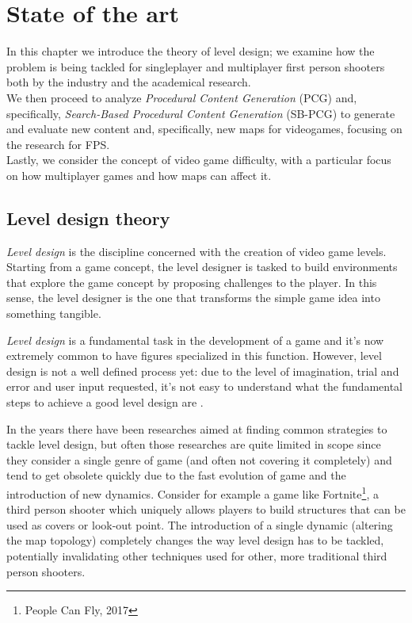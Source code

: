 \chapter{State of the art}

In this chapter we introduce the theory of level design; we examine how the problem is being tackled for singleplayer and multiplayer first person shooters both by the industry and the academical research. \\
We then proceed to analyze \textit{Procedural Content Generation} (PCG) and, specifically, \textit{Search-Based Procedural Content Generation} (SB-PCG) to generate and evaluate new content and, specifically, new maps for videogames, focusing on the research for FPS. \\
Lastly, we consider the concept of video game difficulty, with a particular focus on how multiplayer games and how maps can affect it. \\

\section{Level design theory}

\textit{Level design} is the discipline concerned with the creation of video game levels. Starting from a game concept, the level designer is tasked to build environments that explore the game concept by proposing challenges to the player. In this sense, the level designer is the one that transforms the simple game idea into something tangible.

\textit{Level design} is a fundamental task in the development of a game and it’s now extremely common to have figures specialized in this function. However, level design is not a well defined process yet: due to the level of imagination, trial and error and user input requested, it’s not easy to understand what the fundamental steps to achieve a good level design are \cite{the_invisible_hand}. 

In the years there have been researches aimed at finding common strategies to tackle level design, but often those researches are quite limited in scope since they consider a single genre of game (and often not covering it completely) and tend to get obsolete quickly due to the fast evolution of game and the introduction of new dynamics. Consider for example a game like Fortnite\footnote{People Can Fly, 2017}, a third person shooter which uniquely allows players to build structures that can be used as covers or look-out point. The introduction of a single dynamic (altering the map topology) completely changes the way level design has to be tackled, potentially invalidating other techniques used for other, more traditional third person shooters.

